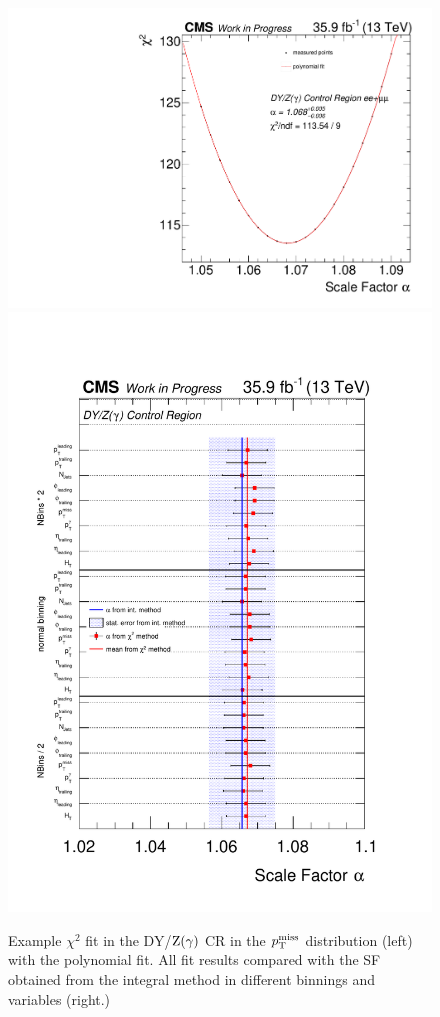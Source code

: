 \begin{figure}[tbp]
 \centering
 \includegraphics[width=\pairwidth]{figures/plots_CR/chi/DY_LL_met}
 \includegraphics[width=\pairwidth]{figures/plots_CR/chi/DY_CompareLL}
 \caption{Example $\chi^2$ fit in the DY/$\mathrm{Z}(\gamma)$ CR in the $p_{\mathrm{T}}^\text{miss}$ distribution (left) with the polynomial fit. All fit results compared with the SF obtained from the integral method in different binnings and variables (right.)}
 \label{fig:chiDY}
\end{figure}

